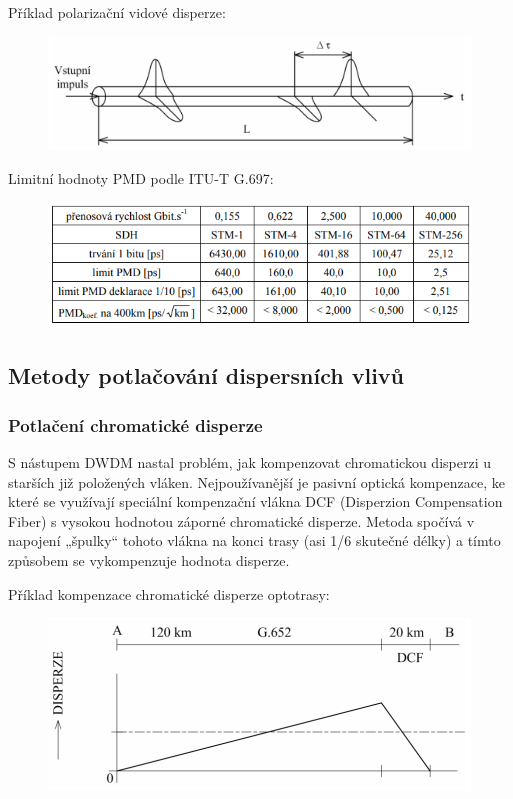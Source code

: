 Příklad polarizační vidové disperze:
\begin{figure}[!ht]
\begin{center}
    \includegraphics[scale=1]{obrazky/polardisp.png}
  \end{center}
\end{figure}

Limitní hodnoty PMD podle ITU-T G.697:
\begin{figure}[!ht]
\begin{center}
    \includegraphics[scale=1]{obrazky/ITUpolar.png}
  \end{center}
\end{figure}

\subsection{Metody potlačování dispersních vlivů}
\subsubsection{Potlačení chromatické disperze}
S nástupem DWDM nastal problém, jak kompenzovat chromatickou disperzi u starších již položených vláken. Nejpoužívanější je pasivní optická kompenzace, ke které se využívají speciální kompenzační vlákna DCF (Disperzion Compensation Fiber) s vysokou hodnotou záporné chromatické disperze. Metoda spočívá v napojení „špulky“ tohoto vlákna na konci trasy (asi 1/6 skutečné délky) a tímto způsobem se vykompenzuje hodnota disperze.

Příklad kompenzace chromatické disperze optotrasy:
\begin{figure}[!ht]
\begin{center}
    \includegraphics[scale=1]{obrazky/chromkomp.png}
  \end{center}
\end{figure}

